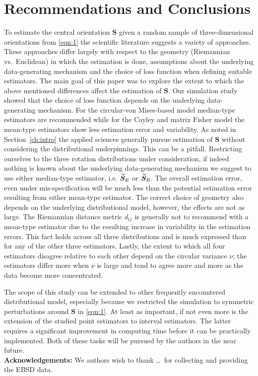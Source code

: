 
\section{Recommendations and Conclusions}\label{sec:disc}

To estimate the central orientation $\bm S$ given a random sample of three-dimensional orientations from \eqref{eqn:1} the scientific literature suggests a variety of approaches. These approaches differ largely with respect to the geometry (Riemannian vs.~Euclidean) in which the estimation is done, assumptions about the underlying data-generating mechanism and the choice of loss function when defining suitable estimators. The main goal of this paper was to explore the extent to which the above mentioned differences affect the estimation of $\bm S$. 
Our simulation study showed that the choice of loss function depends on the underlying data-generating mechanism.  For the circular-von Mises-based model median-type estimators are recommended while for the Cayley and matrix Fisher model the mean-type estimators show less estimation error and variability. As noted in Section~\ref{ch:intro} the applied sciences generally pursue estimation of $\bm S$ without considering the distributional underpinnings. This can be a pitfall. Restricting ourselves to the three rotation distributions under consideration,  if indeed nothing is known about the underlying data-generating mechanism we suggest to use either median-type estimator, i.e. ${\widetilde{\bm S}_E}$ or ${\widetilde{\bm S}_R}$. The overall estimation error, even under mis-specification will be much less than the potential estimation error resulting from either mean-type estimator. The correct choice of geometry also depends on the underlying distributional model, however, the effects are not as large. The Riemannian distance metric  $d_G$ is generally not to recommend with a mean-type estimator due to the resulting increase in variability in the estimation errors. This fact holds across all three distributions  and is much expressed than for any of the other three estimators.
Lastly, the extent to which all four estimators disagree relative to each other depend on the circular variance $\nu$; the estimators differ more when $\nu$ is large and tend to agree more and more as the data become more concentrated.  
   
The scope of this study can be extended to other frequently encountered distributional model, especially because we restricted the simulation to symmetric perturbations around $\bm S$ in \eqref{eqn:1}. At least as important, if not even more is the extension of the studied point estimators to interval estimators. The latter requires a significant improvement in computing time before it can be practically implemented. Both of these tasks will be pursued by the authors in the near future.\\

\noindent \textbf{Acknowledgements:} We authors wish to thank \ldots \, for collecting and providing the EBSD data. 

